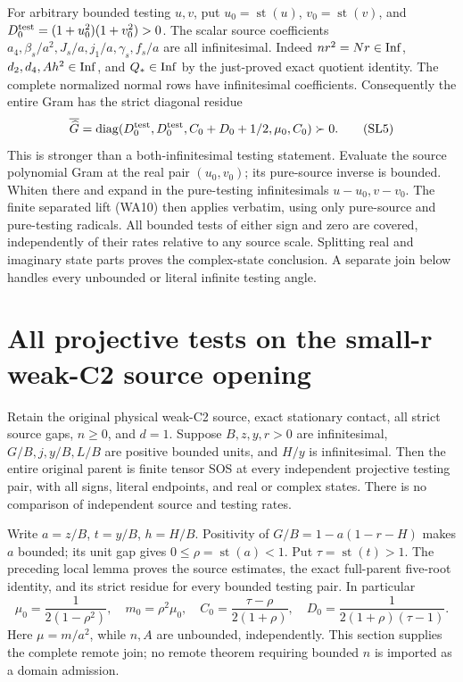 For arbitrary bounded testing $u,v$, put $u_0=\operatorname{st}(u)$,
$v_0=\operatorname{st}(v)$, and $D_0^{\rm test}=(1+u_0^2)(1+v_0^2)>0$.
The scalar source coefficients
$a_4,\beta_s/a^2,J_s/a,j_1/a,\gamma_s,f_s/a$ are all infinitesimal.
Indeed $nr^2=Nr\in\operatorname{Inf}$, $d_2,d_4,Ah^2\in\operatorname{Inf}$, and
$Q_*\in\operatorname{Inf}$ by the just-proved exact quotient identity.
The complete normalized normal rows have infinitesimal coefficients.
Consequently the entire Gram has the strict diagonal residue
\[
 \overline{\widehat G}
 =\operatorname{diag}(D_0^{\rm test},D_0^{\rm test},
                     C_0+D_0+1/2,\mu_0,C_0)\succ0.       \tag{SL5}
\]
This is stronger than a both-infinitesimal testing statement.
Evaluate the source polynomial Gram at the real pair $(u_0,v_0)$;
its pure-source inverse is bounded. Whiten there and expand in the
pure-testing infinitesimals $u-u_0,v-v_0$. The finite separated
lift (WA10) then applies verbatim, using only pure-source
and pure-testing radicals. All bounded tests of either sign and
zero are covered, independently of their rates relative to any
source scale. Splitting real and imaginary state parts proves the
complex-state conclusion. A separate join below handles every
unbounded or literal infinite testing angle.


\section{\texorpdfstring{All projective tests on the small-r weak-C2 source opening}{All projective tests on the small-r weak-C2 source opening}}
\label{component:p34609a6519a6}

\label{p34609a6519a6:sec:r11-small-r-remote}
\begin{theorem}
Retain the original physical weak-C2 source, exact stationary contact,
all strict source gaps, $n\ge0$, and $d=1$. Suppose $B,z,y,r>0$
are infinitesimal, $G/B,j,y/B,L/B$ are positive bounded units,
and $H/y$ is infinitesimal. Then the entire original parent is
finite tensor SOS at every independent projective testing pair,
with all signs, literal endpoints, and real or complex states.
There is no comparison of independent source and testing rates.
\end{theorem}
Write $a=z/B$, $t=y/B$, $h=H/B$. Positivity of
$G/B=1-a(1-r-H)$ makes $a$ bounded; its unit gap gives
$0\le\rho=\operatorname{st}(a)<1$. Put
$\tau=\operatorname{st}(t)>1$. The preceding local lemma proves
the source estimates, the exact full-parent five-root identity,
and its strict residue for every bounded testing pair. In particular
\[
 \mu_0=\frac1{2(1-\rho^2)},\quad m_0=\rho^2\mu_0,\quad
 C_0=\frac{\tau-\rho}{2(1+\rho)},\quad
 D_0=\frac1{2(1+\rho)(\tau-1)}.                 \tag{SR1}
\]
Here $\mu=m/a^2$, while $n,A$ are unbounded, independently.
This section supplies the complete remote join; no remote theorem
requiring bounded $n$ is imported as a domain admission.

